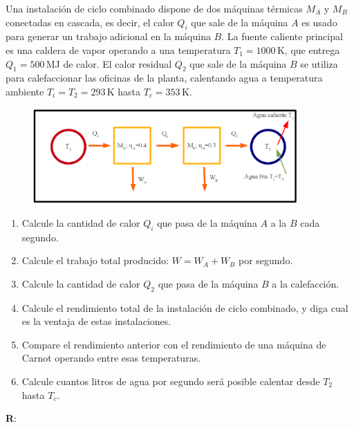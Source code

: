 \documentclass[a4paper,12pt]{article}
\begin{document}
\begin{enumerate}
		Una instalación de ciclo combinado dispone de dos máquinas térmicas
		$M_A$ y $M_B$ conectadas en cascada, es decir, el calor $Q_i$ que sale
		de la máquina $A$ es usado para generar un trabajo adicional en la
		máquina $B$.  La fuente caliente principal es una caldera de vapor
		operando a una temperatura $T_1=1000$\,K, que entrega $Q_1=500$\,MJ de
		calor. El calor residual $Q_2$ que sale de la máquina $B$ se utiliza
		para calefaccionar las oficinas de la planta, calentando agua a
		temperatura ambiente $T_i=T_2=293$\,K hasta $T_c=353$\,K.
		\begin{figure}[hhhhhb!]
			\centering
			\includegraphics[width=0.9\textwidth]{maq2}
		\end{figure}
		\begin{enumerate}
			\item Calcule la cantidad de calor $Q_i$ que pasa de la máquina $A$
				a la $B$ cada segundo.
			\item Calcule el trabajo total producido:
					$W=W_A+W_B$ por segundo.
			\item Calcule la cantidad de calor $Q_2$ que pasa de la máquina $B$
				a la calefacción.
			\item Calcule el rendimiento total de la instalación de ciclo
				combinado, y diga cual es la ventaja de estas instalaciones.
			\item Compare el rendimiento anterior con el rendimiento de una
				máquina de Carnot operando entre esas temperaturas.
			\item Calcule cuantos litros de agua por segundo será posible
				calentar desde $T_2$ hasta $T_c$.
		\end{enumerate}
		{\bf{R}}: 
\end{enumerate}
\end{document}

